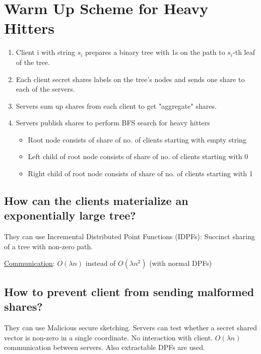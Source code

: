 \section{Warm Up Scheme for Heavy Hitters}
\begin{enumerate}
    \item Client i with string $s_i$ prepares a binary tree with 1s on the path to $s_i$-th leaf of the tree.
    \item Each client secret shares labels on the tree's nodes and sends one share to each of the servers. 
    \item Servers sum up shares from each client to get "aggregate" shares.
    \item Servers publish shares to perform BFS search for heavy hitters
    \begin{itemize}
        \item Root node consists of share of no. of clients starting with empty string
        \item Left child of root node consists of share of no. of clients starting with 0
        \item Right child of root node consists of share of no. of clients starting with 1
    \end{itemize}
\end{enumerate}

\subsection{How can the clients materialize an exponentially large tree?}
They can use Incremental Distributed Point Functions (IDPFs): Succinct sharing of a tree with non-zero path.

\underline{Communication}: $O(\lambda n)$ instead of $O (\lambda n^2)$ (with normal DPFs)

\subsection{How to prevent client from sending malformed shares?}
They can use Malicious secure sketching. Servers can test whether a secret shared vector is non-zero in a single coordinate. No interaction with client. $O(\lambda n)$ communication between servers. Also extractable DPFs are used.




%
